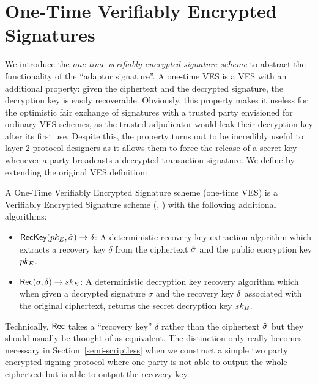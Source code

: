 \section{One-Time Verifiably Encrypted Signatures}
\label{otVES}
We introduce the \emph{one-time verifiably encrypted signature scheme} to abstract the functionality of the ``adaptor signature''\cite{poelstra-adaptor}. A one-time VES is a VES with an additional property: given the ciphertext and the decrypted signature, the decryption key is easily recoverable.
Obviously, this property makes it useless for the optimistic fair exchange of signatures with a trusted party envisioned for ordinary VES schemes, as the trusted adjudicator would leak their decryption key after its first use.
Despite this, the property turns out to be incredibly useful to layer-2 protocol designers as it allows them to force the release of a secret key whenever a party broadcasts a decrypted transaction signature.
We define by extending the original VES definition:

\begin{definition}
A One-Time Verifiably Encrypted Signature scheme (one-time VES) is a Verifiably Encrypted Signature scheme (\SIGNALG, \VESALG) with the following additional algorithms:
\begin{itemize}
    \item $\textsf{RecKey}(pk_E, \hat{\sigma}) \rightarrow \delta$: A deterministic recovery key extraction algorithm which extracts a recovery key $\delta$ from the ciphertext $\hat{\sigma}$ and the public encryption key $pk_E$.
    \item $\textsf{Rec}(\sigma,\delta) \rightarrow sk_E$: A deterministic decryption key recovery algorithm which when given a decrypted signature $\sigma$ and the recovery key $\delta$ associated with the original ciphertext, returns the secret decryption key $sk_E$.
\end{itemize}

\end{definition}

Technically, $\textsf{Rec}$ takes a ``recovery key'' $\delta$ rather than the ciphertext $\hat{\sigma}$ but they should usually be thought of as equivalent. The distinction only really becomes necessary in Section~\ref{semi-scriptless} when we construct a simple two party encrypted signing protocol where one party is not able to output the whole ciphertext but is able to output the recovery key.

